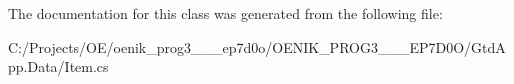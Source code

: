 The documentation for this class was generated from the following file\+:\begin{DoxyCompactItemize}
\item 
C\+:/\+Projects/\+O\+E/oenik\+\_\+prog3\+\_\+\_\+\_\+ep7d0o/\+O\+E\+N\+I\+K\+\_\+\+P\+R\+O\+G3\+\_\+\_\+\_\+\+E\+P7\+D0\+O/\+Gtd\+App.\+Data/Item.\+cs\end{DoxyCompactItemize}

